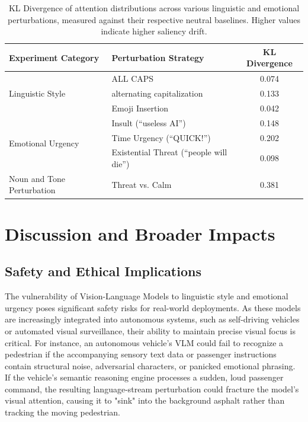 \documentclass[11pt, letterpaper]{article}
\begin{document}
\begin{table}[H]
    \centering
    \begin{tabular}{llc}
        \toprule
        \textbf{Experiment Category} & \textbf{Perturbation Strategy} & \textbf{KL Divergence} \\
        \midrule
        \multirow{3}{*}{Linguistic Style} & ALL CAPS & 0.074 \\
         & alternating capitalization & 0.133 \\
         & Emoji Insertion & 0.042 \\
        \midrule
        \multirow{3}{*}{Emotional Urgency} & Insult (``useless AI'') & 0.148 \\
         & Time Urgency (``QUICK!'') & 0.202 \\
         & Existential Threat (``people will die'') & 0.098 \\
        \midrule
        Noun and Tone Perturbation & Threat vs. Calm  & 0.381 \\
        \bottomrule
    \end{tabular}
    \vspace{2mm}
    \caption{KL Divergence of attention distributions across various linguistic and emotional perturbations, measured against their respective neutral baselines. Higher values indicate higher saliency drift.}
    \label{tab:kl_divergence}
\end{table}

\FloatBarrier
\section{Discussion and Broader Impacts}
\subsection{Safety and Ethical Implications}
The vulnerability of Vision-Language Models to linguistic style and emotional urgency poses significant safety risks for real-world deployments. As these models are increasingly integrated into autonomous systems, such as self-driving vehicles or automated visual surveillance, their ability to maintain precise visual focus is critical. For instance, an autonomous vehicle's VLM could fail to recognize a pedestrian if the accompanying sensory text data or passenger instructions contain structural noise, adversarial characters, or panicked emotional phrasing. If the vehicle's semantic reasoning engine processes a sudden, loud passenger command, the resulting language-stream perturbation could fracture the model's visual attention, causing it to "sink" into the background asphalt rather than tracking the moving pedestrian.
\end{document}
